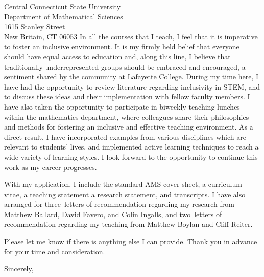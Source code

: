 \documentclass[12pt]{letter}
\def\diversityblurb{In all the courses that I teach, I feel that it is imperative to foster an inclusive environment.
  It is my firmly held belief that everyone should have equal access to education and, along this line, I believe that traditionally underrepresented groups should be embraced and encouraged, a sentiment shared by the community at Lafayette College.
  During my time here, I have had the opportunity to review literature regarding inclusivity in STEM, and to discuss these ideas and their implementation with fellow faculty members.
  I have also taken the opportunity to participate in biweekly teaching lunches within the mathematics department, where colleagues share their philosophies and methods for fostering an inclusive and effective teaching environment.
  As a direct result, I have incorporated examples from various disciplines which are relevant to students' lives, and implemented active learning techniques to reach a wide variety of learning styles.
  I look forward to the opportunity to continue this work as my career progresses.}
\def\materials{the standard AMS cover sheet,
  a curriculum vitae,
  a teaching statement
  a research statement,
  and transcripts}
\def\numresrefs{three}
\def\numteachrefs{two}
\def\refs{Matthew Ballard,
  David Favero,
  and Colin Ingalls}
\def\teachingrefs{Matthew Boylan and Cliff Reiter}
\begin{document}
\begin{letter}{
    Central Connecticut State University\\
    Department of Mathematical Sciences\\
    1615 Stanley Street\\
    New Britain, CT 06053
  }
  \diversityblurb
  
With my application, I include \materials.
I have also arranged for \numresrefs\  letters of recommendation regarding my research from \refs, and \numteachrefs\ letters of recommendation regarding my teaching from \teachingrefs.



  Please let me know if there is anything else I can provide.
  Thank you in advance for your time and consideration.
  \closing{Sincerely,}
\end{letter}
\end{document}
